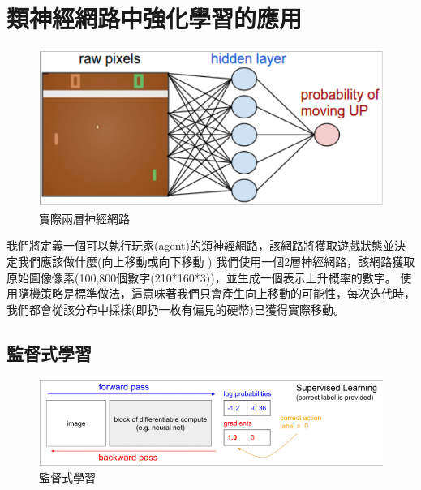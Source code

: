 \documentclass[14pt,a4paper]{report}  %
\begin{document}
\section{類神經網路中強化學習的應用}
\begin{figure}[hbt!]
\begin{center}
\includegraphics[scale=0.74]{ network}
\caption{實際兩層神經網路}
\end{center}

\end{figure}

 我們將定義一個可以執行玩家(agent)的類神經網路，該網路將獲取遊戲狀態並決定我們應該做什麼(向上移動或向下移動
) 我們使用一個2層神經網路，該網路獲取原始圖像像素(100,800個數字(210*160*3))，並生成一個表示上升概率的數字。 使用隨機策略是標準做法，這意味著我們只會產生向上移動的可能性，每次迭代時，我們都會從該分布中採樣(即扔一枚有偏見的硬幣)已獲得實際移動。\\


\subsection{監督式學習}
\begin{figure}[hbt!]
\begin{center}
\includegraphics[scale=0.74]{supervising_learning}
\caption{監督式學習}
\end{center}
\end{figure}
\end{document}
